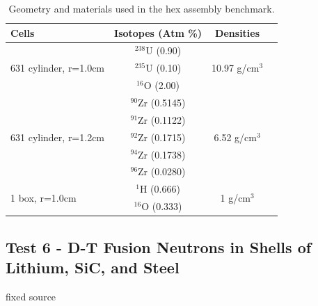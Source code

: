 \documentclass[preprint,12pt]{elsarticle}
\begin{document}
\begin{table}[h]
\centering
\caption{Geometry and materials used in the hex assembly benchmark.}
\label{hex_geom}
\begin{tabular}{| l | c | c | c |}
\hline
Cells & Isotopes (Atm \%)& Densities \\
\hline
\multirow{3}{*}{631 cylinder, r=1.0cm }  &   $^{238}$U   (0.90) &    \multirow{3}{*}{10.97 g/cm$^3$} \\
&  $^{235}$U (0.10)& \\
&  $^{16}$O  (2.00)& \\
\hline
\multirow{5}{*}{631 cylinder, r=1.2cm }  &   $^{90}$Zr   (0.5145) &    \multirow{5}{*}{6.52 g/cm$^3$} \\
&  $^{91}$Zr  (0.1122)& \\
&  $^{92}$Zr  (0.1715)& \\
&  $^{94}$Zr  (0.1738)& \\
&  $^{96}$Zr  (0.0280)& \\
\hline
\multirow{2}{*}{1 box, r=1.0cm }  &   $^{1}$H   (0.666) &    \multirow{2}{*}{1 g/cm$^3$} \\
&  $^{16}$O  (0.333)& \\
\hline
\end{tabular}
\end{table}

\subsection{Test 6 - D-T Fusion Neutrons in Shells of Lithium, SiC, and Steel}

fixed source
\end{document}
